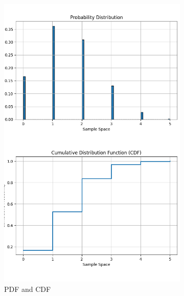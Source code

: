 \documentclass{article}
\begin{document}
\begin{figure}[H]
  \centering
  \begin{subfigure}{0.45\textwidth}
    \centering
    \includegraphics[width=\linewidth]{results/section1/d1(1).png}
    \caption{PDF and CDF}
  \end{subfigure}
  \hfill
  \begin{subfigure}{0.45\textwidth}
    \centering

\end{subfigure}
\end{figure}
\end{document}
